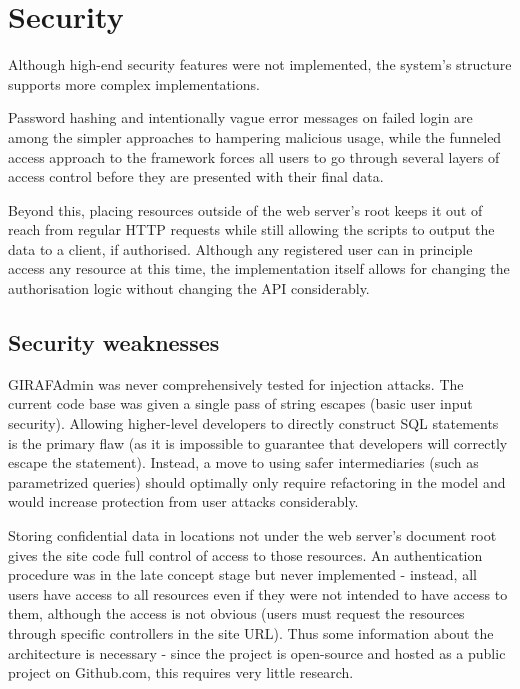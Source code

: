 \section{Security}

Although high-end security features were not implemented, the system's structure supports more complex implementations.

Password hashing and intentionally vague error messages on failed login are among the simpler approaches to hampering malicious usage, while the funneled access approach to the framework forces all users to go through several layers of access control before they are presented with their final data.

Beyond this, placing resources outside of the web server's root keeps it out of reach from regular HTTP requests while still allowing the scripts to output the data to a client, if authorised. Although any registered user can in principle access any resource at this time, the implementation itself allows for changing the authorisation logic without changing the API considerably.

\subsection{Security weaknesses}
GIRAFAdmin was never comprehensively tested for injection attacks. The current code base was given a single pass of string escapes (basic user input security). Allowing higher-level developers to directly construct SQL statements is the primary flaw (as it is impossible to guarantee that developers will correctly escape the statement). Instead, a move to using safer intermediaries (such as parametrized queries) should optimally only require refactoring in the model and would increase protection from user attacks considerably. 

Storing confidential data in locations not under the web server's document root gives the site code full control of access to those resources. An authentication procedure was in the late concept stage but never implemented - instead, all users have access to all resources even if they were not intended to have access to them, although the access is not obvious (users must request the resources through specific controllers in the site URL). Thus some information about the architecture is necessary - since the project is open-source and hosted as a public project on Github.com, this requires very little research. 


